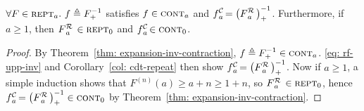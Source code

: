 \begin{thm} \label{thm: cdt-inv-rf}
	$\forall F\in \text{\scshape{rept}}_a.~f\triangleq F^{-1}_+$ satisfies $f \in \text{\scshape{cont}}_{a}$ and $\displaystyle \cdt{f}{a} \ = \left(\rf{F}{a}\ \right)^{-1}_+$. Furthermore, if $a\ge 1$, then $\rf{F}{a}\ \in \repeatable_0$ and $\cdt{f}{a}\ \in \contract_0$.
\end{thm}
\begin{proof}
	By Theorem~\ref{thm: expansion-inv-contraction}, $f\triangleq F^{-1}_+ \in \text{\scshape{cont}}_a$. 
	\eqref{eq: rf-upp-inv} and Corollary~\ref{col: cdt-repeat}
	then show $\cdt{f}{a}\ = \left(\rf{F}{a}\ \right)^{-1}_+$.
	Now if $a\ge 1$, a simple induction shows that $F^{(n)}(a)\ge a + n\ge 1 + n$, so $\rf{F}{a}\ \in \repeatable_0$, hence $\cdt{f}{a} \ = \left(\rf{F}{a}\ \right)^{-1}_+ \in \contract_0$ by Theorem~\ref{thm: expansion-inv-contraction}.
\end{proof}


